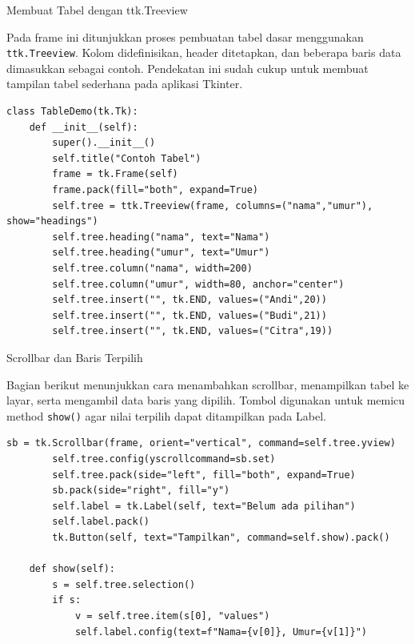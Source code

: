 \documentclass[aspectratio=169, table]{beamer}
\begin{document}
\begin{frame}[fragile]{Membuat Tabel dengan ttk.Treeview}
\vspace{20pt}

Pada frame ini ditunjukkan proses pembuatan tabel dasar menggunakan \texttt{ttk.Treeview}. Kolom didefinisikan, header ditetapkan, dan beberapa baris data dimasukkan sebagai contoh. Pendekatan ini sudah cukup untuk membuat tampilan tabel sederhana pada aplikasi Tkinter.

\begin{lstlisting}[style=PythonStyle, basicstyle=\ttfamily\scriptsize]
class TableDemo(tk.Tk):
    def __init__(self):
        super().__init__()
        self.title("Contoh Tabel")
        frame = tk.Frame(self)
        frame.pack(fill="both", expand=True)
        self.tree = ttk.Treeview(frame, columns=("nama","umur"), show="headings")
        self.tree.heading("nama", text="Nama")
        self.tree.heading("umur", text="Umur")
        self.tree.column("nama", width=200)
        self.tree.column("umur", width=80, anchor="center")
        self.tree.insert("", tk.END, values=("Andi",20))
        self.tree.insert("", tk.END, values=("Budi",21))
        self.tree.insert("", tk.END, values=("Citra",19))
\end{lstlisting}

\end{frame}

\begin{frame}[fragile]{Scrollbar dan Baris Terpilih}
\vspace{20pt}

Bagian berikut menunjukkan cara menambahkan scrollbar, menampilkan tabel ke layar, serta mengambil data baris yang dipilih. Tombol digunakan untuk memicu method \texttt{show()} agar nilai terpilih dapat ditampilkan pada Label.

\begin{lstlisting}[style=PythonStyle, basicstyle=\ttfamily\scriptsize]
        sb = tk.Scrollbar(frame, orient="vertical", command=self.tree.yview)
        self.tree.config(yscrollcommand=sb.set)
        self.tree.pack(side="left", fill="both", expand=True)
        sb.pack(side="right", fill="y")
        self.label = tk.Label(self, text="Belum ada pilihan")
        self.label.pack()
        tk.Button(self, text="Tampilkan", command=self.show).pack()

    def show(self):
        s = self.tree.selection()
        if s:
            v = self.tree.item(s[0], "values")
            self.label.config(text=f"Nama={v[0]}, Umur={v[1]}")
\end{lstlisting}

\end{frame}
\end{document}
